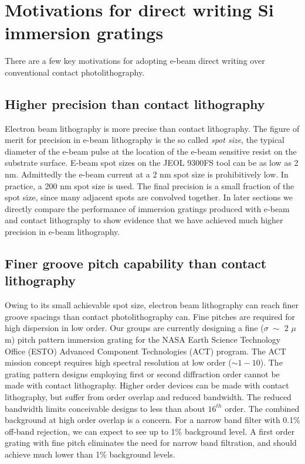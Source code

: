 \documentclass[]{spie}  %
\begin{document}
\section{Motivations for direct writing Si immersion gratings}
There are a few key motivations for adopting e-beam direct writing over conventional contact photolithography.  

\subsection{Higher precision than contact lithography}
\label{sec:Precis}
Electron beam lithography is more precise than contact lithography.  The figure of merit for precision in e-beam lithography is the so called \emph{spot size}, the typical diameter of the e-beam pulse at the location of the e-beam sensitive resist on the substrate surface.  E-beam spot sizes on the JEOL 9300FS tool can be as low as 2 nm.  Admittedly the e-beam current at a 2 nm spot size is prohibitively low.  In practice, a 200 nm spot size is used.  The final precision is a small fraction of the spot size, since many adjacent spots are convolved together.  In later sections we directly compare the performance of immersion gratings produced with e-beam and contact lithography to show evidence that we have achieved much higher precision in e-beam lithography.  

\subsection{Finer groove pitch capability than contact lithography}
Owing to its small achievable spot size, electron beam lithography can reach finer groove spacings than contact photolithography can.  Fine pitches are required for high dispersion in low order.  Our groups are currently designing a fine ($\sigma \; \sim$ 2 $\mu$m) pitch pattern immersion grating for the NASA Earth Science Technology Office (ESTO) Advanced Component Technologies (ACT) program.  The ACT mission concept requires high spectral resolution at low order ($\sim1-10$).  The grating pattern designs employing first or second diffraction order cannot be made with contact lithography.  Higher order devices can be made with contact lithography, but suffer from order overlap and reduced bandwidth.  The reduced bandwidth limits conceivable designs to less than about $16^{th}$ order.  The combined background at high order overlap is a concern.  For a narrow band filter with 0.1\% off-band rejection, we can expect to see up to 1\% background level.  A first order grating with fine pitch eliminates the need for narrow band filtration, and should achieve much lower than 1\% background levels.  
\end{document}

